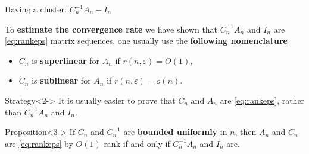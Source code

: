 \documentclass[aspectratio=169,xcolor=dvipsnames]{beamer}
\begin{document}
\begin{frame}{Having a cluster: $C_n^{-1}A_n - I_n$}

To \textbf{estimate the convergence rate} we have shown that $C_{n}^{-1}A_n$ and $I_n$ are \eqref{eq:rankeps} matrix sequences, one usually use the \textbf{following nomenclature} 
\begin{itemize}
	\item[\faBook] $C_n$ is \textbf{superlinear} for $A_n$ if $r(n,\varepsilon) = O(1)$,
	\item[\faBook] $C_n$ is \textbf{sublinear} for $A_n$ if $r(n,\varepsilon) = o(n)$.
\end{itemize} 

\begin{exampleblock}{\faWrench\;Strategy}<2->
	It is usually easier to prove that $C_n$ and $A_n$ are \eqref{eq:rankeps}, rather than $C_n^{-1}A_n$ and $I_n$.
\end{exampleblock}

\begin{alertblock}{Proposition}<3->
If $C_n$ and $C_n^{-1}$ are \textbf{bounded uniformly} in $n$, then $A_n$ and $C_n$ are \eqref{eq:rankeps} by $O(1)$ rank if and only if $C_n^{-1}A_n$ and $I_n$ are.
\end{alertblock}


\end{frame}
\end{document}

